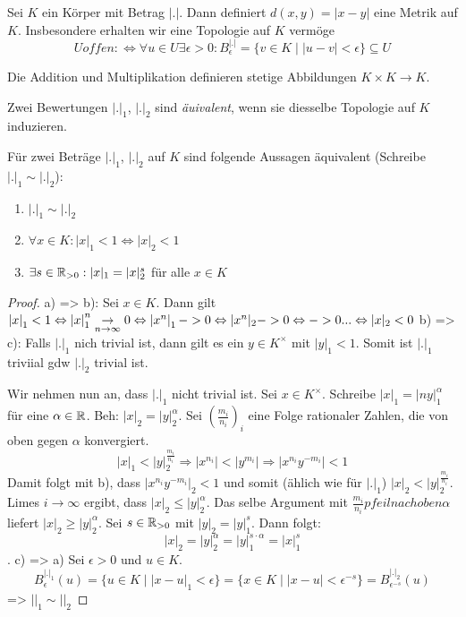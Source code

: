 \documentclass[../main.tex]{subfiles}
\begin{document}
\begin{definition}
    Sei $K$ ein Körper mit Betrag $|.|$.
    Dann definiert $d(x,y)= |x-y|$ eine Metrik auf $K$.
    Insbesondere erhalten wir eine Topologie auf $K$ vermöge 
    $$U offen :\Leftrightarrow\forall {u\in U} \exists {\epsilon >0}: B_{\epsilon}^{|.|} = \{v\in K\mid |u-v|<\epsilon\}\subseteq U$$
\end{definition}
\begin{remark}
    Die Addition und Multiplikation definieren stetige Abbildungen $K\times K \rightarrow K$.
\end{remark}
\begin{definition}
    Zwei Bewertungen $|.|_1$, $|.|_2$ sind \emph{äuivalent}, wenn sie diesselbe Topologie auf $K$ induzieren.
\end{definition}
\begin{lemma}
    Für zwei Beträge $|.|_1$, $|.|_2$ auf $K$ sind folgende Aussagen äquivalent (Schreibe $|.|_1 \sim|.|_2$):
    \begin{enumerate}[label=\alph*)]
        \item $|.|_1 \sim|.|_2$
        \item $\forall {x\in K}: |x|_1 <1 \Leftrightarrow |x|_2<1$
        \item $\exists {s\in \mathbb{R}_{>0}}: |x|_1 = |x|_2^s$ für alle $x\in K$
    \end{enumerate}
\end{lemma}
\begin{proof}
    a) => b):%
    Sei $x\in K$. Dann gilt $\left\vert x \right\vert_1<1\Leftrightarrow \left\vert x \right\vert_1^n\underset{n\rightarrow \infty}{\rightarrow} 0 \Leftrightarrow \left\vert x^n \right\vert_1 -> 0 \Leftrightarrow |x^n|_2 -> 0\Leftrightarrow ->0 ...\Leftrightarrow |x|_2 <0$
    b) => c):
    Falls $|.|_1$ nich trivial ist, dann gilt es ein $y\in K^\times$ mit $|y|_1 <1$.
    Somit ist $|.|_1$ triviial gdw $|.|_2$ trivial ist.

    Wir nehmen nun an, dass $|.|_1$ nicht trivial ist.
    Sei $x\in K^\times$. Schreibe $|x|_1 = |ny|_1^\alpha$ für eine $\alpha\in \mathbb{R}$.
    Beh: $|x|_2 = |y|_2^\alpha$.
    Sei $(\frac{m_i}{n_i})_i$ eine Folge rationaler Zahlen, die von oben gegen $\alpha$ konvergiert.
    $$|x|_1< |y|_2^{\frac{m_i}{n_i}} \Rightarrow |x^{n_i}| < |y^{m_i}| \Rightarrow |x^{n_i}y^{-m_i}| <1$$
     Damit folgt mit b), dass $|x^{n_i}y^{-m_i}|_2 <1$ und somit (ählich wie für $|.|_1$) $|x|_2< |y|_2^{\frac{m_i}{n_i}}$.
     Limes $i\rightarrow\infty$ ergibt, dass $|x|_2\leq |y|_2^\alpha$.
      Das selbe Argument mit $\frac{m_i}{n_i} pfeil nach oben \alpha$ liefert $|x|_2 \geq |y|_2^\alpha$.
      Sei $s\in \mathbb{R}_{>0}$ mit $|y|_2 = |y|_1^s$.
      Dann folgt:
      $$|x|_2 = |y|_2^\alpha = |y|_1^{s\cdot \alpha} = |x|_1^s$$.
      c) => a)
      Sei $\epsilon >0$ und $u\in K$.
      $$B_\epsilon^{|.|_1}(u) = \{u\in K\mid |x-u|_1<\epsilon\} = \{x\in K\mid |x-u|<\epsilon^{-s}\} = B_{\epsilon^{-s}}^{|.|_2}(u)$$
      => $||_1\sim||_2$
\end{proof}
\end{document}
